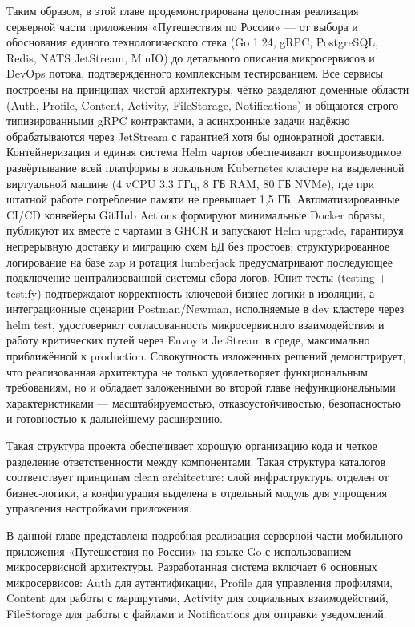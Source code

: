 Таким образом, в этой главе продемонстрирована целостная реализация серверной части приложения «Путешествия по России» — от выбора и обоснования единого технологического стека (Go 1.24, gRPC, PostgreSQL, Redis, NATS JetStream, MinIO) до детального описания микросервисов и DevOps потока, подтверждённого комплексным тестированием. Все сервисы построены на принципах чистой архитектуры, чётко разделяют доменные области (Auth, Profile, Content, Activity, FileStorage, Notifications) и общаются строго типизированными gRPC контрактами, а асинхронные задачи надёжно обрабатываются через JetStream с гарантией хотя бы однократной доставки. Контейнеризация и единая система Helm чартов обеспечивают воспроизводимое развёртывание всей платформы в локальном Kubernetes кластере на выделенной виртуальной машине (4 vCPU 3,3 ГГц, 8 ГБ RAM, 80 ГБ NVMe), где при штатной работе потребление памяти не превышает 1,5 ГБ. Автоматизированные CI/CD конвейеры GitHub Actions формируют минимальные Docker образы, публикуют их вместе с чартами в GHCR и запускают Helm upgrade, гарантируя непрерывную доставку и миграцию схем БД без простоев; структурированное логирование на базе zap и ротация lumberjack предусматривают последующее подключение централизованной системы сбора логов. Юнит тесты (testing + testify) подтверждают корректность ключевой бизнес логики в изоляции, а интеграционные сценарии Postman/Newman, исполняемые в dev кластере через helm test, удостоверяют согласованность микросервисного взаимодействия и работу критических путей через Envoy и JetStream в среде, максимально приближённой к production. Совокупность изложенных решений демонстрирует, что реализованная архитектура не только удовлетворяет функциональным требованиям, но и обладает заложенными во второй главе нефункциональными характеристиками — масштабируемостью, отказоустойчивостью, безопасностью и готовностью к дальнейшему расширению.

Такая структура проекта обеспечивает хорошую организацию кода и четкое разделение ответственности между компонентами. Такая структура каталогов соответствует принципам clean architecture: слой инфраструктуры отделен от бизнес-логики, а конфигурация выделена в отдельный модуль для упрощения управления настройками приложения.

В данной главе представлена подробная реализация серверной части мобильного приложения «Путешествия по России» на языке Go с использованием микросервисной архитектуры. Разработанная система включает 6 основных микросервисов: Auth для аутентификации, Profile для управления профилями, Content для работы с маршрутами, Activity для социальных взаимодействий, FileStorage для работы с файлами и Notifications для отправки уведомлений.
